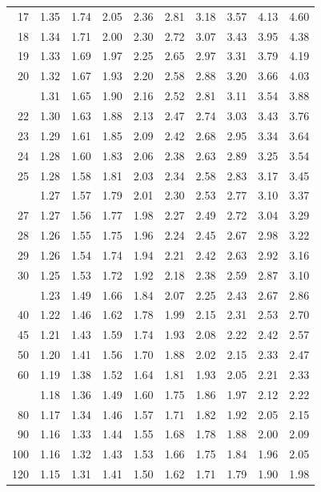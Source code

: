 \documentclass[10pt]{article}
\begin{document}
\begin{longtable}{@{}r!{\vrule width 0.8pt\hspace{0.55em}}rrrrrrrrr@{}}
17 & 1.35 & 1.74 & 2.05 & 2.36 & 2.81 & 3.18 & 3.57 & 4.13 & 4.60 \\
18 & 1.34 & 1.71 & 2.00 & 2.30 & 2.72 & 3.07 & 3.43 & 3.95 & 4.38 \\
19 & 1.33 & 1.69 & 1.97 & 2.25 & 2.65 & 2.97 & 3.31 & 3.79 & 4.19 \\
20 & 1.32 & 1.67 & 1.93 & 2.20 & 2.58 & 2.88 & 3.20 & 3.66 & 4.03 \\
 & 1.31 & 1.65 & 1.90 & 2.16 & 2.52 & 2.81 & 3.11 & 3.54 & 3.88 \\
22 & 1.30 & 1.63 & 1.88 & 2.13 & 2.47 & 2.74 & 3.03 & 3.43 & 3.76 \\
23 & 1.29 & 1.61 & 1.85 & 2.09 & 2.42 & 2.68 & 2.95 & 3.34 & 3.64 \\
24 & 1.28 & 1.60 & 1.83 & 2.06 & 2.38 & 2.63 & 2.89 & 3.25 & 3.54 \\
25 & 1.28 & 1.58 & 1.81 & 2.03 & 2.34 & 2.58 & 2.83 & 3.17 & 3.45 \\
 & 1.27 & 1.57 & 1.79 & 2.01 & 2.30 & 2.53 & 2.77 & 3.10 & 3.37 \\
27 & 1.27 & 1.56 & 1.77 & 1.98 & 2.27 & 2.49 & 2.72 & 3.04 & 3.29 \\
28 & 1.26 & 1.55 & 1.75 & 1.96 & 2.24 & 2.45 & 2.67 & 2.98 & 3.22 \\
29 & 1.26 & 1.54 & 1.74 & 1.94 & 2.21 & 2.42 & 2.63 & 2.92 & 3.16 \\
30 & 1.25 & 1.53 & 1.72 & 1.92 & 2.18 & 2.38 & 2.59 & 2.87 & 3.10 \\
 & 1.23 & 1.49 & 1.66 & 1.84 & 2.07 & 2.25 & 2.43 & 2.67 & 2.86 \\
40 & 1.22 & 1.46 & 1.62 & 1.78 & 1.99 & 2.15 & 2.31 & 2.53 & 2.70 \\
45 & 1.21 & 1.43 & 1.59 & 1.74 & 1.93 & 2.08 & 2.22 & 2.42 & 2.57 \\
50 & 1.20 & 1.41 & 1.56 & 1.70 & 1.88 & 2.02 & 2.15 & 2.33 & 2.47 \\
60 & 1.19 & 1.38 & 1.52 & 1.64 & 1.81 & 1.93 & 2.05 & 2.21 & 2.33 \\
 & 1.18 & 1.36 & 1.49 & 1.60 & 1.75 & 1.86 & 1.97 & 2.12 & 2.22 \\
80 & 1.17 & 1.34 & 1.46 & 1.57 & 1.71 & 1.82 & 1.92 & 2.05 & 2.15 \\
90 & 1.16 & 1.33 & 1.44 & 1.55 & 1.68 & 1.78 & 1.88 & 2.00 & 2.09 \\
100 & 1.16 & 1.32 & 1.43 & 1.53 & 1.66 & 1.75 & 1.84 & 1.96 & 2.05 \\
120 & 1.15 & 1.31 & 1.41 & 1.50 & 1.62 & 1.71 & 1.79 & 1.90 & 1.98 \\

\end{longtable}
\end{document}
